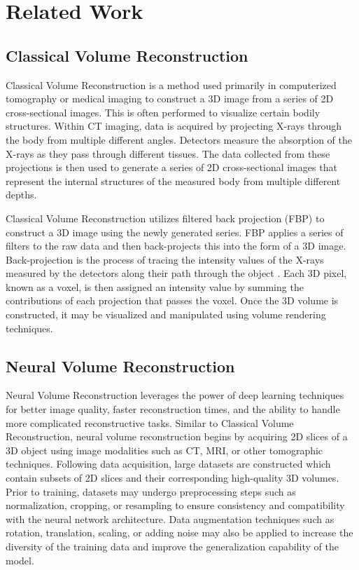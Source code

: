 \section{Related Work}
\subsection{Classical Volume Reconstruction}

Classical Volume Reconstruction is a method used primarily in computerized tomography or medical imaging to construct a 3D image from a series of 2D cross-sectional images. This is often performed to visualize certain bodily structures. Within CT imaging, data is acquired by projecting X-rays through the body from multiple different angles. Detectors measure the absorption of the X-rays as they pass through different tissues. The data collected from these projections is then used to generate a series of 2D cross-sectional images that represent the internal structures of the measured body from multiple different depths. 

Classical Volume Reconstruction utilizes filtered back projection (FBP) to construct a 3D image using the newly generated series. FBP applies a series of filters to the raw data and then back-projects this into the form of a 3D image. Back-projection is the process of tracing the intensity values of the X-rays measured by the detectors along their path through the object \cite{Piala21}. Each 3D pixel, known as a voxel, is then assigned an intensity value by summing the contributions of each projection that passes the voxel. Once the 3D volume is constructed, it may be visualized and manipulated using volume rendering techniques.  


\subsection{Neural Volume Reconstruction}

Neural Volume Reconstruction leverages the power of deep learning techniques for better image quality, faster reconstruction times, and the ability to handle more complicated reconstructive tasks. Similar to Classical Volume Reconstruction, neural volume reconstruction begins by acquiring 2D slices of a 3D object using image modalities such as CT, MRI, or other tomographic techniques. Following data acquisition, large datasets are constructed which contain subsets of 2D slices and their corresponding high-quality 3D volumes. Prior to training, datasets may undergo preprocessing steps such as normalization, cropping, or resampling to ensure consistency and compatibility with the neural network architecture. Data augmentation techniques such as rotation, translation, scaling, or adding noise may also be applied to increase the diversity of the training data and improve the generalization capability of the model.

